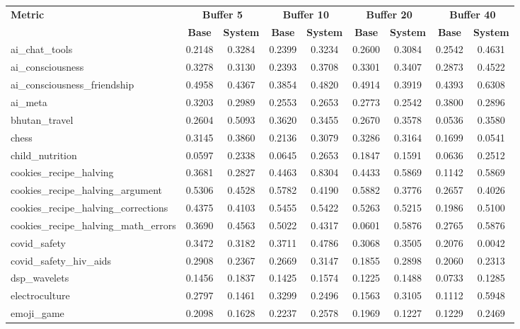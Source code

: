 \begin{landscape}
\begin{longtable}{@{}p{3.8cm}cccccccc@{}}
\toprule
\textbf{Metric} & \multicolumn{2}{c}{\textbf{Buffer 5}} & \multicolumn{2}{c}{\textbf{Buffer 10}} & \multicolumn{2}{c}{\textbf{Buffer 20}} & \multicolumn{2}{c}{\textbf{Buffer 40}} \\
\cmidrule(lr){2-3}\cmidrule(lr){4-5}\cmidrule(lr){6-7}\cmidrule(lr){8-9}
 & \textbf{Base} & \textbf{System} & \textbf{Base} & \textbf{System} & \textbf{Base} & \textbf{System} & \textbf{Base} & \textbf{System} \\
\midrule
\endhead
ai\_chat\_tools & 0.2148 & 0.3284 & 0.2399 & 0.3234 & 0.2600 & 0.3084 & 0.2542 & 0.4631 \\
ai\_consciousness & 0.3278 & 0.3130 & 0.2393 & 0.3708 & 0.3301 & 0.3407 & 0.2873 & 0.4522 \\
ai\_consciousness\_friendship & 0.4958 & 0.4367 & 0.3854 & 0.4820 & 0.4914 & 0.3919 & 0.4393 & 0.6308 \\
ai\_meta & 0.3203 & 0.2989 & 0.2553 & 0.2653 & 0.2773 & 0.2542 & 0.3800 & 0.2896 \\
bhutan\_travel & 0.2604 & 0.5093 & 0.3620 & 0.3455 & 0.2670 & 0.3578 & 0.0536 & 0.3580 \\
chess & 0.3145 & 0.3860 & 0.2136 & 0.3079 & 0.3286 & 0.3164 & 0.1699 & 0.0541 \\
child\_nutrition & 0.0597 & 0.2338 & 0.0645 & 0.2653 & 0.1847 & 0.1591 & 0.0636 & 0.2512 \\
cookies\_recipe\_halving & 0.3681 & 0.2827 & 0.4463 & 0.8304 & 0.4433 & 0.5869 & 0.1142 & 0.5869 \\
cookies\_recipe\_halving\_argument & 0.5306 & 0.4528 & 0.5782 & 0.4190 & 0.5882 & 0.3776 & 0.2657 & 0.4026 \\
cookies\_recipe\_halving\_corrections & 0.4375 & 0.4103 & 0.5455 & 0.5422 & 0.5263 & 0.5215 & 0.1986 & 0.5100 \\
cookies\_recipe\_halving\_math\_errors & 0.3690 & 0.4563 & 0.5022 & 0.4317 & 0.0601 & 0.5876 & 0.2765 & 0.5876 \\
covid\_safety & 0.3472 & 0.3182 & 0.3711 & 0.4786 & 0.3068 & 0.3505 & 0.2076 & 0.0042 \\
covid\_safety\_hiv\_aids & 0.2908 & 0.2367 & 0.2669 & 0.3147 & 0.1855 & 0.2898 & 0.2060 & 0.2313 \\
dsp\_wavelets & 0.1456 & 0.1837 & 0.1425 & 0.1574 & 0.1225 & 0.1488 & 0.0733 & 0.1285 \\
electroculture & 0.2797 & 0.1461 & 0.3299 & 0.2496 & 0.1563 & 0.3105 & 0.1112 & 0.5948 \\
emoji\_game & 0.2098 & 0.1628 & 0.2237 & 0.2578 & 0.1969 & 0.1227 & 0.1229 & 0.2469 \\

\end{longtable}
\end{landscape}
